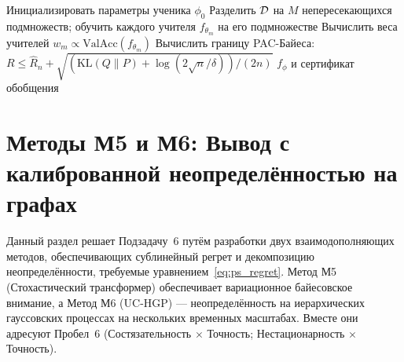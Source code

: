 \begin{algorithm}[htbp]
\caption{MambaShield: Обучение с прогрессивной состязательной дистилляцией робастности}\label{alg:mamba}
Инициализировать параметры ученика $\phi_0$\;
Разделить $\mathcal{D}$ на $M$ непересекающихся подмножеств; обучить каждого учителя $f_{\theta_m}$ на его подмножестве\;
Вычислить веса учителей $w_m \propto \mathrm{ValAcc}(f_{\theta_m})$\;
Вычислить границу PAC-Байеса: $R \le \hat{R}_n + \sqrt{(\mathrm{KL}(Q\|P)+\log(2\sqrt{n}/\delta))/(2n)}$\;
\Return $f_\phi$ и сертификат обобщения
\end{algorithm}


\section{Методы М5 и М6: Вывод с калиброванной неопределённостью на графах}
\label{sec:stochastic}

Данный раздел решает Подзадачу~6 путём разработки двух взаимодополняющих методов, обеспечивающих сублинейный регрет и декомпозицию неопределённости, требуемые уравнением~\eqref{eq:ps_regret}. Метод М5 (Стохастический трансформер) обеспечивает вариационное байесовское внимание, а Метод М6 (UC-HGP) --- неопределённость на иерархических гауссовских процессах на нескольких временных масштабах. Вместе они адресуют Пробел~6 (Состязательность $\times$ Точность; Нестационарность $\times$ Точность).

